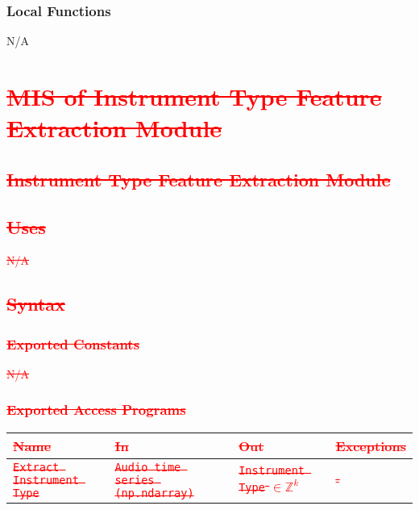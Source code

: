 \documentclass[12pt, titlepage]{article}
\begin{document}
\subsubsection{Local Functions}
N/A

\section{\textcolor{red}{\sout{MIS of Instrument Type Feature Extraction Module}}} 

\subsection{\textcolor{red}{\sout{Instrument Type Feature Extraction Module}}}

\subsection{\textcolor{red}{\sout{Uses}}}
\textcolor{red}{\sout{N/A}}

\subsection{\textcolor{red}{\sout{Syntax}}}

\subsubsection{\textcolor{red}{\sout{Exported Constants}}}
\textcolor{red}{\sout{N/A}}

\subsubsection{\textcolor{red}{\sout{Exported Access Programs}}}

\begin{center}
\begin{tabular}{p{2cm} p{4cm} p{4cm} p{2cm}}
\hline
\textcolor{red}{\sout{\textbf{Name}}} & \textcolor{red}{\sout{\textbf{In}}} & \textcolor{red}{\sout{\textbf{Out}}} & \textcolor{red}{\sout{\textbf{Exceptions}}}\\
\hline
\textcolor{red}{\sout{\texttt{Extract Instrument Type}}} & \textcolor{red}{\sout{\texttt{Audio time series (np.ndarray)}}} & \textcolor{red}{\sout{\texttt{Instrument Type} $\in \mathbb{Z}^k$}} & \textcolor{red}{\sout{-}}\\
\hline
\end{tabular}
\end{center}
\end{document}

